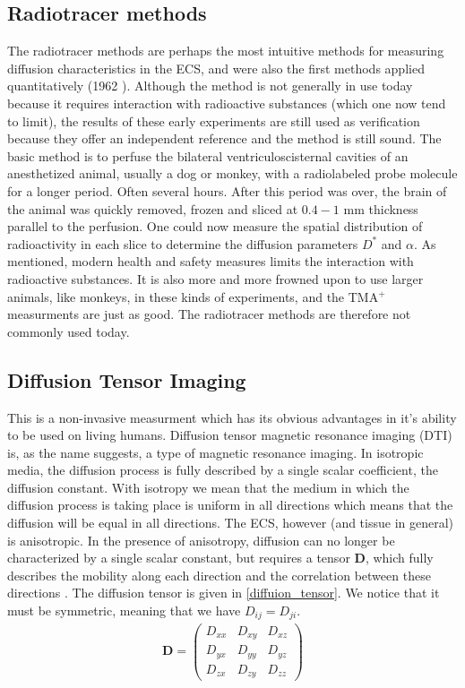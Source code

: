 \documentclass[a4paper,english, 12pt, twoside]{article}
\begin{document}
\subsection{Radiotracer methods}
The radiotracer methods are perhaps the most intuitive methods for measuring diffusion characteristics in the ECS, and were also the first methods applied quantitatively (1962 \cite{}). 
Although the method is not generally in use today because it requires interaction with radioactive substances (which one now tend to limit), the results of these early experiments are still used as verification because they offer an independent reference and the method is still sound. 
The basic method is to perfuse the bilateral ventriculoscisternal cavities of an anesthetized animal, usually a dog or monkey, with a radiolabeled probe molecule for a longer period. Often several hours. 
After this period was over, the brain of the animal was quickly removed, frozen and sliced at $0.4-1$ mm thickness parallel to the perfusion. 
One could now measure the spatial distribution of radioactivity in each slice to determine the diffusion parameters $D^*$ and $\alpha$. 
As mentioned, modern health and safety measures limits the interaction with radioactive substances. 
It is also more and more frowned upon to use larger animals, like monkeys, in these kinds of experiments, and the TMA$^+$ measurments are just as good. 
The radiotracer methods are therefore not commonly used today.

\subsection{Diffusion Tensor Imaging}
This is a non-invasive measurment which has its obvious advantages in it's ability to be used on living humans. 
Diffusion tensor magnetic resonance imaging (DTI) is, as the name suggests, a type of magnetic resonance imaging. 
In isotropic media, the diffusion process is fully described by a single scalar coefficient, the diffusion constant. 
With isotropy we mean that the medium in which the diffusion process is taking place is uniform in all directions which means that the diffusion will be equal in all directions. 
The ECS, however (and tissue in general) is anisotropic. 
In the presence of anisotropy, diffusion can no longer be characterized by a single scalar constant, but requires a tensor $\mathbf{D}$, which fully describes the mobility along each direction and the correlation between these directions \cite{le2001diffusion}. 
The diffusion tensor is given in \ref{diffuion_tensor}. We notice that it must be symmetric, meaning that we have $D_{ij} = D_{ji}$.
\begin{align}\label{diffuion_tensor}
 \mathbf{D} = \left(\begin{array}{ccc}
                     D_{xx} & D_{xy} & D_{xz}\\
                     D_{yx} & D_{yy} & D_{yz}\\
                     D_{zx} & D_{zy} & D_{zz}
                    \end{array}\right)
\end{align}
\end{document}
